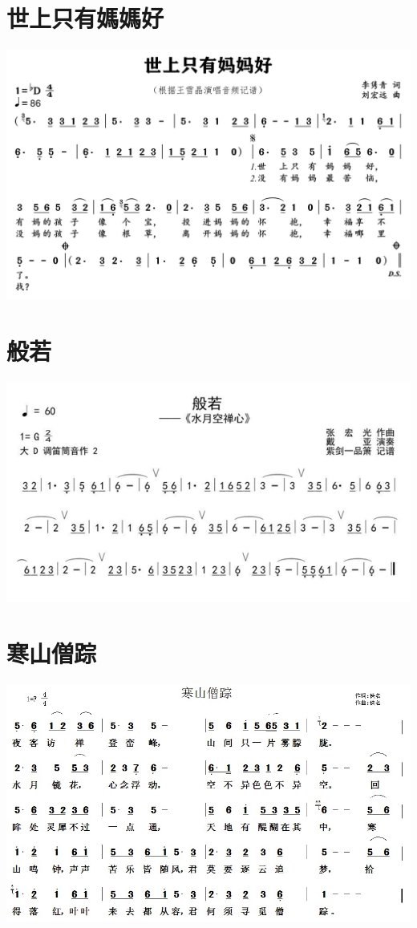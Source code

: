 \documentclass[cn,pad,twocol]{elegantbook}
\begin{document}
\section{世上只有媽媽好}        \includegraphics[width=\textwidth]{dongxiao/IMG_0854-世上只有妈妈好.png}
\section{般若}                  \includegraphics[width=\textwidth]{macos/20210205般若.png}
\section{寒山僧踪}              \includegraphics[width=\textwidth]{dongxiao/20200710-寒山僧踪.jpg}
\end{document}
